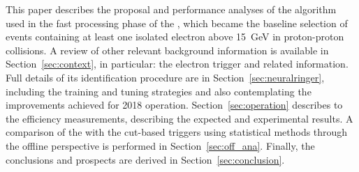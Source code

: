 
This paper describes the proposal and performance analyses of the \rnn{}
algorithm used in the fast processing phase of the \hlt{}, which became the baseline selection of events containing at least one isolated electron above \SI{15}{\GeV} in proton-proton collisions. A review
of other relevant background information is available in
Section~\ref{sec:context}, in particular: the electron
trigger and related information. Full details of its identification procedure are
in Section~\ref{sec:neuralringer}, including the training and tuning strategies and also contemplating the improvements achieved for 2018 operation. Section~\ref{sec:operation} describes to the efficiency measurements, describing the expected and experimental results. A comparison of the \rnn with
the cut-based triggers using statistical methods through the offline perspective
is performed in Section~\ref{sec:off_ana}. Finally, the conclusions and prospects 
are derived in Section~\ref{sec:conclusion}.






